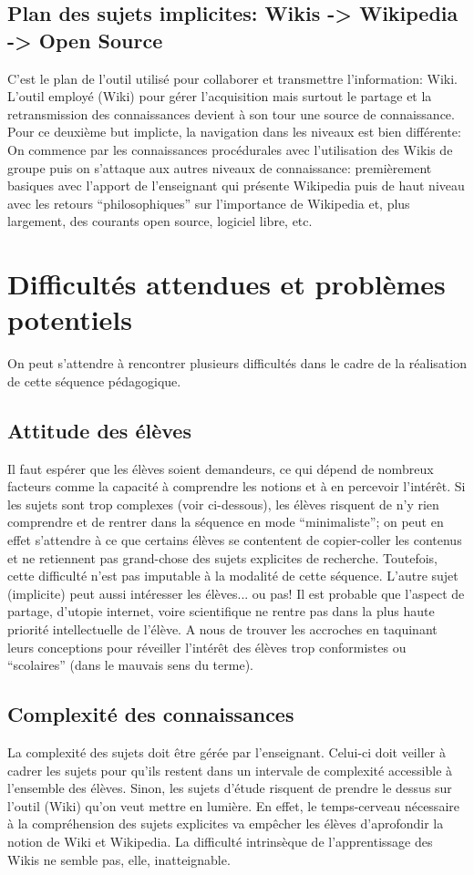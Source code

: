 \documentclass[11pt,bibliography=totoc]{scrartcl}
\begin{document}
\subsection{Plan des sujets implicites: Wikis -> Wikipedia -> Open Source}
C'est le plan de l'outil utilisé pour collaborer et transmettre l'information: Wiki.
L'outil employé (Wiki) pour gérer l'acquisition mais surtout le partage et la retransmission des connaissances devient à son tour une source de connaissance.
Pour ce deuxième but implicte, la navigation dans les niveaux est bien différente:
On commence par les connaissances procédurales avec l'utilisation des Wikis de groupe puis on s'attaque aux autres niveaux de connaissance: premièrement basiques avec l'apport de l'enseignant qui présente Wikipedia puis de haut niveau avec les retours ``philosophiques'' sur l'importance de Wikipedia et, plus largement, des courants open source, logiciel libre, etc.


\section{Difficultés attendues et problèmes potentiels}

On peut s'attendre à rencontrer plusieurs difficultés dans le cadre de la réalisation de cette séquence pédagogique.
\subsection{Attitude des élèves}
Il faut espérer que les élèves soient demandeurs, ce qui dépend de nombreux facteurs comme la capacité à comprendre les notions et à en percevoir l'intérêt. Si les sujets sont trop complexes (voir ci-dessous), les élèves risquent de n'y rien comprendre et de rentrer dans la séquence en mode ``minimaliste''; on peut en effet s'attendre à ce que certains élèves se contentent de copier-coller les contenus et ne retiennent pas grand-chose des sujets explicites de recherche.
Toutefois, cette difficulté n'est pas imputable à la modalité de cette séquence.
L'autre sujet (implicite) peut aussi intéresser les élèves... ou pas! Il est probable que l'aspect de partage, d'utopie internet, voire scientifique ne rentre pas dans la plus haute priorité intellectuelle de l'élève. A nous de trouver les accroches en taquinant leurs conceptions pour réveiller l'intérêt des élèves trop conformistes ou ``scolaires'' (dans le mauvais sens du terme).
\subsection{Complexité des connaissances}
La complexité des sujets doit être gérée par l'enseignant. Celui-ci doit veiller à cadrer les sujets pour qu'ils restent dans un intervale de complexité accessible à l'ensemble des élèves. Sinon, les sujets d'étude risquent de prendre le dessus sur l'outil (Wiki) qu'on veut mettre en lumière. En effet, le temps-cerveau nécessaire à la compréhension des sujets explicites va empêcher les élèves d'aprofondir la notion de Wiki et Wikipedia.
La difficulté intrinsèque de l'apprentissage des Wikis ne semble pas, elle, inatteignable.
\end{document}
